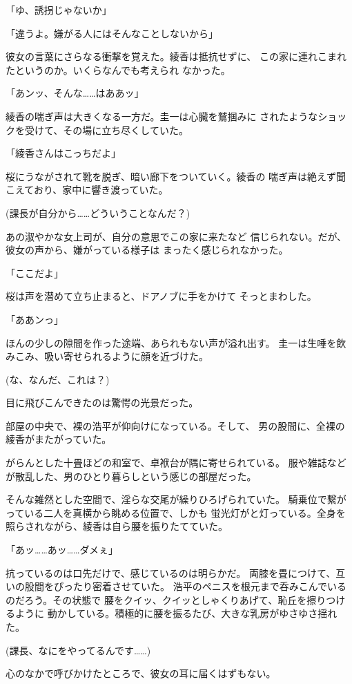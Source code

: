 ﻿\documentclass[
    book,tate,
    line_length=30zw,
    jafontsize=12pt,
    paper=b5j,
    landscape,
    ]{jlreq}
\begin{document}
「ゆ、誘拐じゃないか」

「違うよ。嫌がる人にはそんなことしないから」

彼女の言葉にさらなる衝撃を覚えた。綾香は抵抗せずに、
この家に連れこまれたというのか。いくらなんでも考えられ
なかった。

「あンッ、そんな……はああッ」

綾香の喘ぎ声は大きくなる一方だ。圭一は心臓を鷲掴みに
されたようなショックを受けて、その場に立ち尽くしていた。

「綾香さんはこっちだよ」

桜にうながされて靴を脱ぎ、暗い廊下をついていく。綾香の
喘ぎ声は絶えず聞こえており、家中に響き渡っていた。

(課長が自分から……どういうことなんだ？)

あの淑やかな女上司が、自分の意思でこの家に来たなど
信じられない。だが、彼女の声から、嫌がっている様子は
まったく感じられなかった。

「ここだよ」

桜は声を潜めて立ち止まると、ドアノブに手をかけて
そっとまわした。

「ああンっ」

ほんの少しの隙間を作った途端、あられもない声が溢れ出す。
圭一は生唾を飲みこみ、吸い寄せられるように顔を近づけた。

(な、なんだ、これは？)

目に飛びこんできたのは驚愕の光景だった。

部屋の中央で、裸の浩平が仰向けになっている。そして、
男の股間に、全裸の綾香がまたがっていた。

がらんとした十畳ほどの和室で、卓袱台が隅に寄せられている。
服や雑誌などが散乱した、男のひとり暮らしという感じの部屋だった。

そんな雑然とした空間で、淫らな交尾が繰りひろげられていた。
騎乗位で繋がっている二人を真横から眺める位置で、しかも
蛍光灯がと灯っている。全身を
照らされながら、綾香は自ら腰を振りたてていた。

「あッ……あッ……ダメぇ」

抗っているのは口先だけで、感じているのは明らかだ。
両膝を畳につけて、互いの股間をぴったり密着させていた。 
浩平のペニスを根元まで呑みこんでいるのだろう。その状態で
腰をクイッ、クイッとしゃくりあげて、恥丘を擦りつけるように
動かしている。積極的に腰を振るたび、大きな乳房がゆさゆさ揺れた。

(課長、なにをやってるんです……)

心のなかで呼びかけたところで、彼女の耳に届くはずもない。
\end{document}
